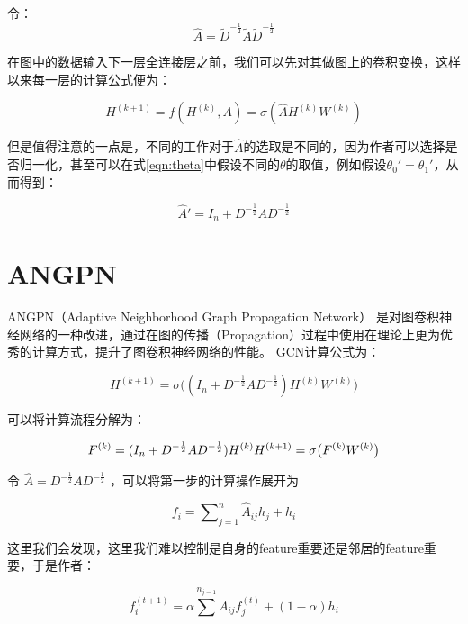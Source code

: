 \documentclass[color=gray,base=hide,cn]{elegantbook}
\begin{document}
令：
\begin{equation}
    \hat{A} = \tilde{D}^{-\frac{1}{2}}\tilde{A}\tilde{D}^{-\frac{1}{2}}
\end{equation}

在图中的数据输入下一层全连接层之前，我们可以先对其做图上的卷积变换，这样以来每一层的计算公式便为：

\begin{equation}
    {H}^{(k+1)} = f(H^{(k)}, A) = \sigma\left(\hat{A} H^{(k)}W^{(k)}\right)
\end{equation}

但是值得注意的一点是，不同的工作对于$\hat{A}$的选取是不同的，因为作者可以选择是否归一化，甚至可以在式\ref{eqn:theta}中假设不同的$\theta$的取值，例如假设$\theta_0' = \theta_1' $，从而得到：

\begin{equation}
    \hat{A}' = {I_n}+{D}^{-\frac{1}{2}}{A}{D}^{-\frac{1}{2}}
\end{equation}

\section{ANGPN}
ANGPN（Adaptive Neighborhood Graph Propagation Network） \cite{Jiang2019SemisupervisedLW}是对图卷积神经网络的一种改进，通过在图的传播（Propagation）过程中使用在理论上更为优秀的计算方式，提升了图卷积神经网络的性能。
GCN计算公式为：

\begin{equation}
    {H}^{(k+1)} = \sigma\big(({I_n}+{D}^{-\frac{1}{2}}{A}{D}^{-\frac{1}{2}}){H}^{(k)}{W}^{(k)}\big)
\end{equation}

可以将计算流程分解为：

\begin{equation}
    {F}^{(k)} = ({I_n}+{D}^{-\frac{1}{2}}{A}{D}^{-\frac{1}{2}}){H}^{(k)} \\ {H}^{(k+1)} = \sigma\big( {F}^{(k)}  {W}^{(k)}\big)
\end{equation}

令 $\hat{{A}} = {D}^{-\frac{1}{2}}{A}{D}^{-\frac{1}{2}}$ ，可以将第一步的计算操作展开为

\begin{equation}
    {f}_i = \sum\nolimits^n_{j=1}\hat{{A}}_{ij}{h}_j  +{h}_i
\end{equation}

这里我们会发现，这里我们难以控制是自身的feature重要还是邻居的feature重要，于是作者：

\begin{equation}
    {f}_i^{(t+1)} = \alpha \sum^n\nolimits_{j=1}{A}_{ij} {f}_j^{(t)} + (1-\alpha){h}_i
\end{equation}
\end{document}

